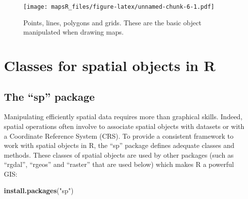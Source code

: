 \documentclass[]{report}
\newenvironment{Shaded}{\begin{snugshade}}{\end{snugshade}}
\newcommand{\KeywordTok}[1]{\textcolor[rgb]{0.13,0.29,0.53}{\textbf{{#1}}}}
\newcommand{\DataTypeTok}[1]{\textcolor[rgb]{0.13,0.29,0.53}{{#1}}}
\newcommand{\DecValTok}[1]{\textcolor[rgb]{0.00,0.00,0.81}{{#1}}}
\newcommand{\StringTok}[1]{\textcolor[rgb]{0.31,0.60,0.02}{{#1}}}
\newcommand{\NormalTok}[1]{{#1}}
\begin{document}
\begin{Shaded}
\end{Shaded}

\begin{figure}[htbp]
\centering
\texttt{[image: mapsR\_files/figure-latex/unnamed-chunk-6-1.pdf]}
\caption{\label{fig1}Points, lines, polygons and grids. These are the
basic object manipulated when drawing maps.}
\end{figure}

\chapter{Classes for spatial objects in
R}\label{classes-for-spatial-objects-in-r}

\section{\texorpdfstring{The ``sp''
package}{The sp package}}\label{the-sp-package}

Manipulating efficiently spatial data requires more than graphical
skills. Indeed, spatial operations often involve to associate spatial
objects with datasets or with a Coordinate Reference System (CRS). To
provide a consistent framework to work with spatial objects in R, the
``sp'' package defines adequate classes and methods. These classes of
spatial objects are used by other packages (such as ``rgdal'', ``rgeos''
and ``raster'' that are used below) which makes R a powerful GIS:

\begin{Shaded}
\begin{Highlighting}[]
\KeywordTok{install.packages}\NormalTok{(}\StringTok{"sp"}\NormalTok{)}
\end{Highlighting}
\end{Shaded}
\end{document}
